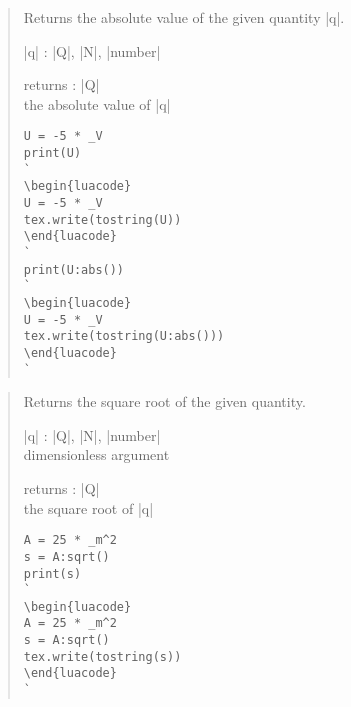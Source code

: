 \documentclass{ltxdoc}
\begin{document}
\begin{quote}
  Returns the absolute value of the given quantity |q|.

  \begin{description}
  \item |q| : |Q|, |N|, |number|\\

  \item returns : |Q|\\
    the absolute value of |q|
  \end{description}


\begin{lstlisting}
U = -5 * _V
print(U)
`
\begin{luacode}
U = -5 * _V
tex.write(tostring(U))
\end{luacode}
`
print(U:abs())
`
\begin{luacode}
U = -5 * _V
tex.write(tostring(U:abs()))
\end{luacode}
`
\end{lstlisting}
\end{quote}




\begin{quote}
  Returns the square root of the given quantity.

  \begin{description}
  \item |q| : |Q|, |N|, |number|\\
    dimensionless argument

  \item returns : |Q|\\
    the square root of |q|
  \end{description}


\begin{lstlisting}
A = 25 * _m^2
s = A:sqrt()
print(s)
`
\begin{luacode}
A = 25 * _m^2
s = A:sqrt()
tex.write(tostring(s))
\end{luacode}
`
\end{lstlisting}
\end{quote}
\end{document}
